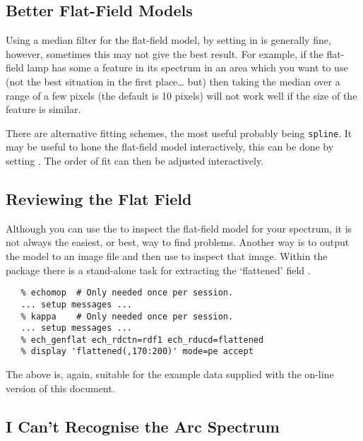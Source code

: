{{\subsection{Better Flat-Field Models}

Using a median filter for the flat-field model, by setting
 in
 is generally fine, however,
sometimes this may not give the best result.
For example, if the flat-field lamp has some a feature in its spectrum in an
area which you want to use (not the best situation in the first place\ldots
but) then taking the median over a range of a few pixels (the default
is 10 pixels) will not work well if the size of the feature is similar.

There are alternative fitting schemes, the most useful probably being
\verb+spline+\@.
It may be useful to hone the flat-field model interactively, this can be
done by setting \@.
The order of fit can then be adjusted interactively.


\subsection{Reviewing the Flat Field}

Although you can use the
 to inspect the flat-field model for
your spectrum, it is not always the easiest, or best, way to find
problems.  Another way is to output the model to an image file and then
use  
to inspect that image.  Within the 
package there is a stand-alone task for extracting the `flattened' field
\@.

{
\scspec{\small}{ }
\begin{verbatim}
   % echomop  # Only needed once per session.
   ... setup messages ...
   % kappa    # Only needed once per session.
   ... setup messages ...
   % ech_genflat ech_rdctn=rdf1 ech_rducd=flattened
   % display 'flattened(,170:200)' mode=pe accept
\end{verbatim}
}

The above is, again, suitable for the example data supplied with the
on-line version of this document.


\subsection{I Can't Recognise the Arc Spectrum}

}}
